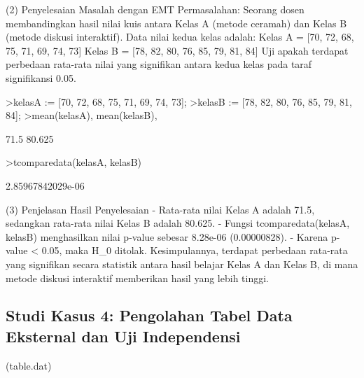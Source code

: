 \documentclass{article}
\newenvironment{eulernotebook}{\par}{\par}
\newcommand{\eulersubheading}[1]{\subsection{#1}}
\newenvironment{eulercomment}{\par\medskip}{\par\medskip}
\begin{document}
\begin{eulernotebook}
\begin{eulercomment}
\begin{eulercomment}
\begin{eulercomment}
\begin{eulercomment}
\begin{eulercomment}
\begin{eulercomment}
\begin{eulercomment}
(2) Penyelesaian Masalah dengan EMT Permasalahan: Seorang dosen
membandingkan hasil nilai kuis antara Kelas A (metode ceramah) dan
Kelas B (metode diskusi interaktif). Data nilai kedua kelas adalah:
Kelas A = [70, 72, 68, 75, 71, 69, 74, 73] Kelas B = [78, 82, 80, 76,
85, 79, 81, 84] Uji apakah terdapat perbedaan rata-rata nilai yang
signifikan antara kedua kelas pada taraf signifikansi 0.05.
\end{eulercomment}
\begin{eulerprompt}
>kelasA := [70, 72, 68, 75, 71, 69, 74, 73];
>kelasB := [78, 82, 80, 76, 85, 79, 81, 84];
>mean(kelasA), mean(kelasB),
\end{eulerprompt}
\begin{euleroutput}
  71.5
  80.625
\end{euleroutput}
\begin{eulerprompt}
>tcomparedata(kelasA, kelasB)
\end{eulerprompt}
\begin{euleroutput}
  2.85967842029e-06
\end{euleroutput}
\begin{eulercomment}
(3) Penjelasan Hasil Penyelesaian - Rata-rata nilai Kelas A adalah
71.5, sedangkan rata-rata nilai Kelas B adalah 80.625. - Fungsi
tcomparedata(kelasA, kelasB) menghasilkan nilai p-value sebesar
8.28e-06 (0.00000828). - Karena p-value \textless{} 0.05, maka H\_0 ditolak.
Kesimpulannya, terdapat perbedaan rata-rata yang signifikan secara
statistik antara hasil belajar Kelas A dan Kelas B, di mana metode
diskusi interaktif memberikan hasil yang lebih tinggi.
\end{eulercomment}
\eulersubheading{Studi Kasus 4: Pengolahan Tabel Data Eksternal dan Uji Independensi}
\begin{eulercomment}
(table.dat)


\end{eulercomment}
\end{eulercomment}
\end{eulercomment}
\end{eulercomment}
\end{eulercomment}
\end{eulercomment}
\end{eulercomment}
\end{eulernotebook}
\end{document}
